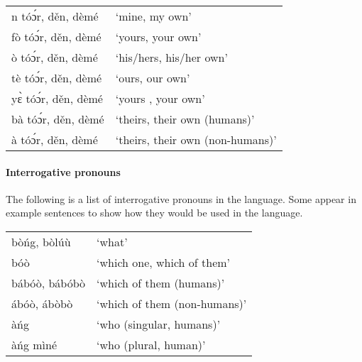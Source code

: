 \begin{refsection}
\ea \label{ex:posspronouns} \begin{tabular}{ll} 
n tóɔ́r, děn, dèmé& ‘mine, my own’\\
fò tóɔ́r, děn, dèmé& ‘yours, your own’\\
ò tóɔ́r, děn, dèmé &‘his/hers, his/her own’\\
tè tóɔ́r, děn, dèmé& ‘ours, our own’\\
yɛ̀ tóɔ́r, děn, dèmé &‘yours , your own’\\
bà tóɔ́r, děn, dèmé &‘theirs, their own (humans)’\\
à tóɔ́r, děn, dèmé& ‘theirs, their own (non-humans)’\\
\end{tabular}\z



\ea {}
\z\z

\paragraph{Interrogative pronouns}
The following is a list of interrogative pronouns in the language. Some appear in example sentences to show how they would be used in the language.

\ea \label{ex:interrpronouns} \begin{tabular}{ll}  
bòńg, bòlúù& ‘what’\\
bóò& ‘which one, which of them’\\
bábóò, bábóbò& ‘which of them (humans)’\\
ábóò, ábòbò& ‘which of them (non-humans)’\\
àńg& ‘who (singular, humans)’\\
àńg mìné &‘who (plural, human)’\\
\end{tabular}\z


\ea \label{ex:interrpronounssents} 
\z\z


\end{refsection}
